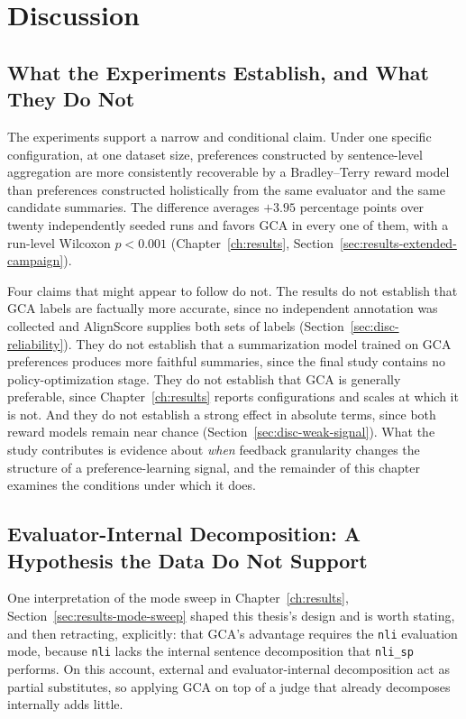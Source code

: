 \chapter{Discussion}
\label{ch:discussion}

\section{What the Experiments Establish, and What They Do Not}
\label{sec:disc-claims}

The experiments support a narrow and conditional claim. Under one specific
configuration, at one dataset size, preferences constructed by sentence-level
aggregation are more consistently recoverable by a Bradley--Terry reward model
than preferences constructed holistically from the same evaluator and the same
candidate summaries. The difference averages $+3.95$ percentage points over
twenty independently seeded runs and favors GCA in every one of them, with a
run-level Wilcoxon $p<0.001$ (Chapter~\ref{ch:results},
Section~\ref{sec:results-extended-campaign}).

Four claims that might appear to follow do not. The results do not establish that
GCA labels are factually more accurate, since no independent annotation was
collected and AlignScore supplies both sets of labels
(Section~\ref{sec:disc-reliability}). They do not establish that a summarization
model trained on GCA preferences produces more faithful summaries, since the final
study contains no policy-optimization stage. They do not establish that GCA is
generally preferable, since Chapter~\ref{ch:results} reports configurations and
scales at which it is not. And they do not establish a strong effect in absolute
terms, since both reward models remain near chance
(Section~\ref{sec:disc-weak-signal}). What the study contributes is evidence about
\emph{when} feedback granularity changes the structure of a preference-learning
signal, and the remainder of this chapter examines the conditions under which it
does.

\section{Evaluator-Internal Decomposition: A Hypothesis the Data Do Not Support}
\label{sec:disc-interpretation}

One interpretation of the mode sweep in Chapter~\ref{ch:results},
Section~\ref{sec:results-mode-sweep} shaped this thesis's design and is worth
stating, and then retracting, explicitly: that GCA's advantage requires the
\texttt{nli} evaluation mode, because \texttt{nli} lacks the internal sentence
decomposition that \texttt{nli\_sp} performs. On this account, external and
evaluator-internal decomposition act as partial substitutes, so applying GCA on
top of a judge that already decomposes internally adds little.

